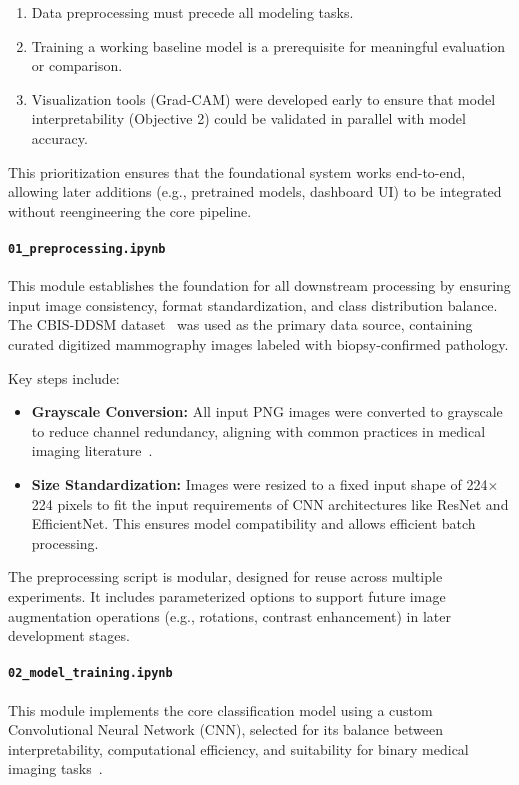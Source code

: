 \documentclass[12pt]{article}
\begin{document}
\begin{enumerate}
    \item Data preprocessing must precede all modeling tasks.
    \item Training a working baseline model is a prerequisite for meaningful evaluation or comparison.
    \item Visualization tools (Grad-CAM) were developed early to ensure that model interpretability (Objective 2) could be validated in parallel with model accuracy.
\end{enumerate}

This prioritization ensures that the foundational system works end-to-end, allowing later additions (e.g., pretrained models, dashboard UI) to be integrated without reengineering the core pipeline.


\paragraph{\texttt{01\_preprocessing.ipynb}}
This module establishes the foundation for all downstream processing by ensuring input image consistency, format standardization, and class distribution balance. The CBIS-DDSM dataset~\cite{18} was used as the primary data source, containing curated digitized mammography images labeled with biopsy-confirmed pathology.

Key steps include:
\begin{itemize}
    \item \textbf{Grayscale Conversion:} All input PNG images were converted to grayscale to reduce channel redundancy, aligning with common practices in medical imaging literature~\cite{7}.
    \item \textbf{Size Standardization:} Images were resized to a fixed input shape of 224$\times$224 pixels to fit the input requirements of CNN architectures like ResNet and EfficientNet. This ensures model compatibility and allows efficient batch processing.
\end{itemize}

The preprocessing script is modular, designed for reuse across multiple experiments. It includes parameterized options to support future image augmentation operations (e.g., rotations, contrast enhancement) in later development stages.

\vspace{0.5em}

\paragraph{\texttt{02\_model\_training.ipynb}}
This module implements the core classification model using a custom Convolutional Neural Network (CNN), selected for its balance between interpretability, computational efficiency, and suitability for binary medical imaging tasks~\cite{17}.
\end{document}
